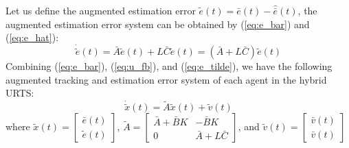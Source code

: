 \documentclass{ieeeaccess}
\begin{document}
Let us define the augmented estimation error $\tilde{e}(t)=\bar{e}(t)-\hat{\bar{e}}(t)$, the augmented estimation error system can be obtained by (\ref{eq:e_bar}) and (\ref{eq:e_hat}):
\begin{equation} \label{eq:e_tilde}
    \dot{\tilde{e}}(t) = \bar{A}\tilde{e}(t) +L\bar{C}\tilde{e}(t) = (\bar{A} +L\bar{C})\tilde{e}(t)
\end{equation}
Combining (\ref{eq:e_bar}), (\ref{eq:u_fb}), and (\ref{eq:e_tilde}), we have the following augmented tracking and estimation error system of each agent in the hybrid URTS:
\begin{equation} \label{eq:x_tilde}
    \dot{\tilde{x}}(t) = \tilde{A}\tilde{x}(t)+\tilde{v}(t)
\end{equation}
where $\tilde{x}(t)=\begin{bmatrix}
    \bar{e}(t) \\ \tilde{e}(t)
\end{bmatrix}$, $\tilde{A}=\begin{bmatrix}
    \bar{A}+\bar{B}K & -\bar{B}K \\ 0 & \bar{A}+L\bar{C}
\end{bmatrix}$, and $\tilde{v}(t)=\begin{bmatrix}
    \bar{v}(t) \\ \bar{v}(t)
\end{bmatrix}$
\end{document}
